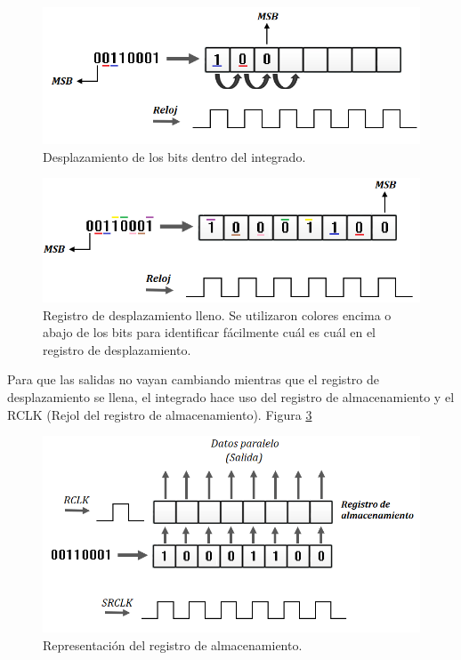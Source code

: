\documentclass{article}
\begin{document}
\begin{figure}[h]
\includegraphics[scale=0.8]{BitsDespla.png}
\centering
\caption{Desplazamiento de los bits dentro del integrado.}
\label{fig:bitsdespla}
\end{figure}

\begin{figure}[h]
\includegraphics[scale=0.8]{registrolleno.png}
\centering
\caption{Registro de desplazamiento lleno. Se utilizaron colores encima o abajo de los bits para identificar fácilmente cuál es cuál en el registro de desplazamiento.}
\label{fig:registrolleno}
\end{figure}

Para que las salidas no vayan cambiando mientras que el registro de desplazamiento se llena, el integrado hace uso del registro de almacenamiento y el RCLK (Rejol del registro de almacenamiento). Figura \ref{fig:registroalmacenamiento}

\newpage
\begin{figure}[h]
\includegraphics[scale=0.8]{regisalmacen.png}
\centering
\caption{Representación del registro de almacenamiento.}
\label{fig:registroalmacenamiento}
\end{figure}
\end{document}
